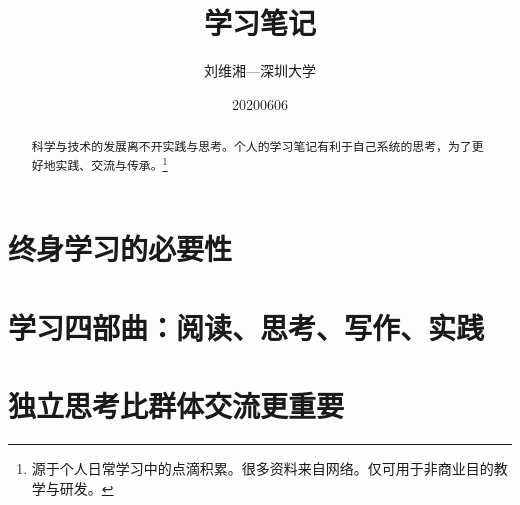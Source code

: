 \documentclass[UTF8,12pt]{ctexart}
\begin{document}
\title{学习笔记}%
\author{刘维湘---深圳大学}%

\date{20200606}%

\maketitle
\begin{abstract}
科学与技术的发展离不开实践与思考。个人的学习笔记有利于自己系统的思考，为了更好地实践、交流与传承。\footnote{源于个人日常学习中的点滴积累。很多资料来自网络。仅可用于非商业目的教学与研发。}

\end{abstract}

\newpage


\newpage
\tableofcontents

\newpage

\newpage
\section{终身学习的必要性}

\newpage
\section{学习四部曲：阅读、思考、写作、实践}

\newpage
\section{独立思考比群体交流更重要}

\end{document}
